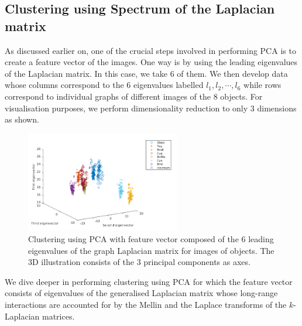 \documentclass[10pt,a4paper]{article}
\begin{document}
\subsection{Clustering using Spectrum of the Laplacian matrix}
As discussed earlier on, one of the crucial steps involved in performing PCA is to create a feature vector of the images. One way is by using the leading eigenvalues of the Laplacian matrix. In this case, we take $6$ of them. We then develop data whose columns correspond to the  $6$ eigenvalues labelled $l_1,l_2,\cdots,l_6$  while rows correspond to individual graphs of different images of the $8$ objects. For visualisation purposes, we perform dimensionality reduction to only $3$ dimensions as shown.
\begin{figure}[H]
	\centering
	\includegraphics[width=0.6\textwidth]{images/No-longrange.png}
	\caption{Clustering using PCA with feature vector composed of the $6$ leading eigenvalues of the graph Laplacian matrix for images of objects. The $3$D illustration consists of the $3$ principal components as axes.}
	\label{}
\end{figure}

We dive deeper in performing clustering using PCA for which the feature vector consists of eigenvalues of the generalised Laplacian matrix whose long-range interactions are accounted for by the Mellin and the Laplace transforms of the $k$-Laplacian matrices.
\end{document}
